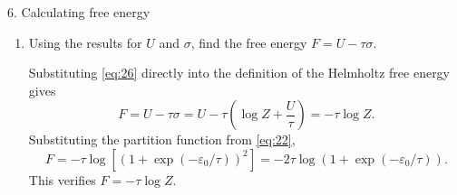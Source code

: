\documentclass[11pt]{article}
\begin{document}
\begin{problem}{6. Calculating free energy}
\begin{enumerate}[label=(\alph*)]
\begin{answer}
      The total multiplicity \( g_{\text{tot}} \) is
      \begin{equation}
      \label{eq:24}
        g_{\text{tot}} = \sum_l g_S(\varepsilon_l) g_R(U_0 - \varepsilon_l) = g_R(U_0) \sum_l g_S(\varepsilon_l)\exp(-\varepsilon_l/\tau) = g_R(U_0) Z.
      \end{equation}
      Taking the logarithm yields the total entropy
      \begin{equation}
      \label{eq:25}
        \sigma_{\text{tot}} = \log_{\text{tot}} = \log g_R(U_0) + \log Z = \sigma_0 + \log Z.
      \end{equation}
      Because the reservoir entropy at equilibrium is \( \sigma_R(U_0 - U) = \sigma_0 - U/\tau \), the entropy of system \( S \) alone is
      \begin{equation}
      \label{eq:26}
        \sigma = \sigma_{\text{tot}} - \sigma_R = \log Z + \frac{U}{\tau}.
      \end{equation}
    \end{answer}
    \item Using the results for \( U \) and \( \sigma \), find the free energy \( F = U - \tau\sigma \).
    \begin{answer}
      Substituting \cref{eq:26} directly into the definition of the Helmholtz free energy gives
      \begin{equation}
      \label{eq:27}
        F = U - \tau\sigma = U - \tau \left( \log Z + \frac{U}{\tau} \right) = -\tau \log Z.
      \end{equation}
      Substituting the partition function from \cref{eq:22},
      \begin{equation}
      \label{eq:28}
        F = -\tau \log\left[\left(1 + \exp(-\varepsilon_0/\tau)\right)^2\right] = -2\tau \log\left(1 + \exp(-\varepsilon_0/\tau)\right).
      \end{equation}
      This verifies \( F = -\tau \log Z \).
    \end{answer}
  \end{enumerate}
\end{problem}
\end{document}
